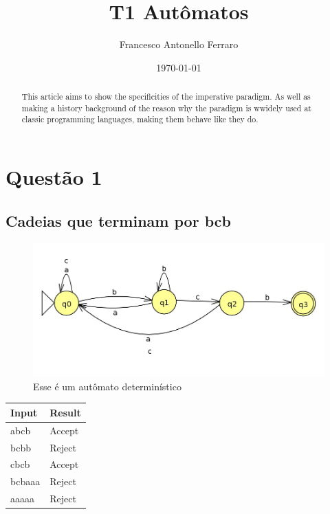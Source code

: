 \documentclass[11pt]{article}
\author{Francesco Antonello Ferraro}
\date{\today}
\title{T1 Autômatos}
\begin{document}
\maketitle
\begin{abstract}
This article aims to show the specificities of the imperative paradigm. As well as making a history background of the reason why the paradigm is wwidely used at classic programming languages, making them behave like they do.
\end{abstract}

\section{Questão 1}
\label{sec:org9864db6}

\subsection{Cadeias que terminam por bcb}
\label{sec:orgc22309c}
\begin{figure}[htbp]
\centering
\includegraphics[width=.9\linewidth]{./q1/a/q1a.jpg}
\caption{\label{fig:org699c6e8}
Esse é um autômato determinístico}
\end{figure}

\begin{center}
\begin{tabular}{ll}
Input & Result\\
\hline
abcb & Accept\\
bcbb & Reject\\
cbcb & Accept\\
bcbaaa & Reject\\
aaaaa & Reject\\
\end{tabular}
\end{center}
\end{document}
